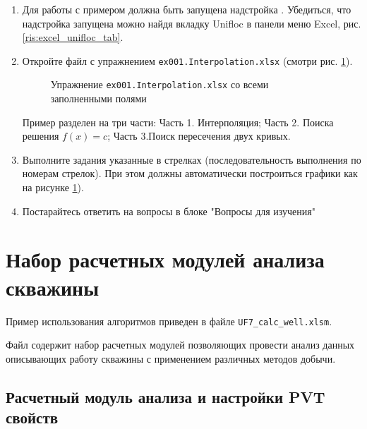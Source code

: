 \begin{enumerate}
	\item Для работы с примером должна быть запущена надстройка \unf{}. Убедиться, что надстройка запущена можно найдя вкладку Unifloc в панели меню Excel, рис. \ref{ris:excel_unifloc_tab}.
	

	
	\item Откройте файл с упражнением \texttt{ex001.Interpolation.xlsx} (смотри рис. \ref{ris:Ex001_1}).
	
	\begin{figure}[h!]
		\center{\texttt{[image: Ex001\_1]}}
		\caption{Упражнение \texttt{ex001.Interpolation.xlsx} со всеми заполненными полями}
		\label{ris:Ex001_1}
	\end{figure}
	
	Пример разделен на три части: Часть 1. Интерполяция; Часть 2. Поиска решения $f(x)=c$; Часть 3.Поиск пересечения двух кривых.
	
	\item Выполните задания указанные в стрелках (последовательность выполнения по номерам стрелок). При этом должны автоматически построиться графики как на рисунке \ref{ris:Ex001_1}).
	
	\item Постарайтесь ответить на вопросы в блоке "Вопросы для изучения"

\end{enumerate}


















\section{Набор расчетных модулей анализа скважины}
Пример использования алгоритмов \unf   приведен в файле \texttt{UF7\_calc\_well.xlsm}.

Файл содержит набор расчетных модулей позволяющих провести анализ данных описывающих работу скважины с применением различных методов добычи.

\subsection{Расчетный модуль анализа и настройки PVT свойств}

